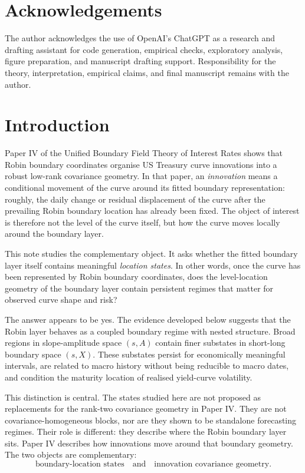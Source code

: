 \documentclass[11pt]{article}
\begin{document}
\section*{Acknowledgements}
The author acknowledges the use of OpenAI's ChatGPT as a research and drafting assistant for code generation, empirical checks, exploratory analysis, figure preparation, and manuscript drafting support. Responsibility for the theory, interpretation, empirical claims, and final manuscript remains with the author.


\section{Introduction}

Paper IV of the Unified Boundary Field Theory of Interest Rates \cite{batty-paper4} shows that Robin boundary coordinates organise US Treasury curve innovations into a robust low-rank covariance geometry. In that paper, an \emph{innovation} means a conditional movement of the curve around its fitted boundary representation: roughly, the daily change or residual displacement of the curve after the prevailing Robin boundary location has already been fixed. The object of interest is therefore not the level of the curve itself, but how the curve moves locally around the boundary layer.

This note studies the complementary object. It asks whether the fitted boundary layer itself contains meaningful \emph{location states}. In other words, once the curve has been represented by Robin boundary coordinates, does the level-location geometry of the boundary layer contain persistent regimes that matter for observed curve shape and risk?

The answer appears to be yes. The evidence developed below suggests that the Robin layer behaves as a coupled boundary regime with nested structure. Broad regions in slope-amplitude space $(s,A)$ contain finer substates in short-long boundary space $(s,X)$. These substates persist for economically meaningful intervals, are related to macro history without being reducible to macro dates, and condition the maturity location of realised yield-curve volatility.

This distinction is central. The states studied here are not proposed as replacements for the rank-two covariance geometry in Paper IV. They are not covariance-homogeneous blocks, nor are they shown to be standalone forecasting regimes. Their role is different: they describe where the Robin boundary layer sits. Paper IV describes how innovations move around that boundary geometry. The two objects are complementary:
\[
\text{boundary-location states} \quad \text{and} \quad \text{innovation covariance geometry}.
\]
\end{document}
